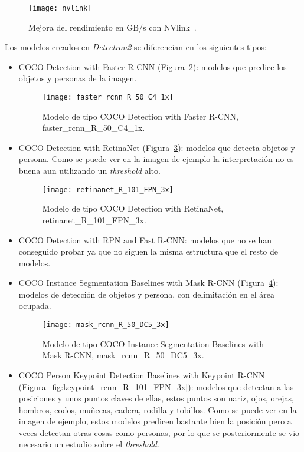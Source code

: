 \begin{figure}[h]
	\centering
	\texttt{[image: nvlink]}
	\caption{Mejora del rendimiento en GB/s con NVlink~\cite{nvlink}.}
	\label{fig:nvlink}
\end{figure}

Los modelos creados en \textit{Detectron2} se diferencian en los siguientes tipos:
\begin{itemize}
	\item COCO Detection with Faster R-CNN (Figura~\ref{fig:faster_rcnn_R_50_C4_1x}): modelos que predice los objetos y personas de la imagen.
	\begin{figure}[h]
		\centering
		\texttt{[image: faster\_rcnn\_R\_50\_C4\_1x]}
		\caption{Modelo de tipo COCO Detection with Faster R-CNN, faster\_rcnn\_R\_50\_C4\_1x.}
		\label{fig:faster_rcnn_R_50_C4_1x}
	\end{figure}
	\item COCO Detection with RetinaNet (Figura~\ref{fig:retinanet_R_101_FPN_3x}): modelos que detecta objetos y persona. Como se puede ver en la imagen de ejemplo la interpretación no es buena aun utilizando un \textit{threshold} alto.
	\begin{figure}[h]
		\centering
		\texttt{[image: retinanet\_R\_101\_FPN\_3x]}
		\caption{Modelo de tipo COCO Detection with RetinaNet, retinanet\_R\_101\_FPN\_3x.}
		\label{fig:retinanet_R_101_FPN_3x}
	\end{figure}
	\item COCO Detection with RPN and Fast R-CNN: modelos que no se han conseguido probar ya que no siguen la misma estructura que el resto de modelos.
	\item COCO Instance Segmentation Baselines with Mask R-CNN (Figura~\ref{fig:mask_rcnn_R_50_DC5_3x}): modelos de detección de objetos y persona, con delimitación en el área ocupada.
	\begin{figure}[h]
		\centering
		\texttt{[image: mask\_rcnn\_R\_50\_DC5\_3x]}
		\caption{Modelo de tipo COCO Instance Segmentation Baselines with Mask R-CNN, mask\_rcnn\_R\_50\_DC5\_3x.}
		\label{fig:mask_rcnn_R_50_DC5_3x}
	\end{figure}
	\item COCO Person Keypoint Detection Baselines with Keypoint R-CNN (Figura~\ref{fig:keypoint_rcnn_R_101_FPN_3x}): modelos que detectan a las posiciones y unos puntos claves de ellas, estos puntos son nariz, ojos, orejas, hombros, codos, muñecas, cadera, rodilla y tobillos. Como se puede ver en la imagen de ejemplo, estos modelos predicen bastante bien la posición pero a veces detectan otras cosas como personas, por lo que se posteriormente se vio necesario un estudio sobre el \textit{threshold}.

\end{itemize}
